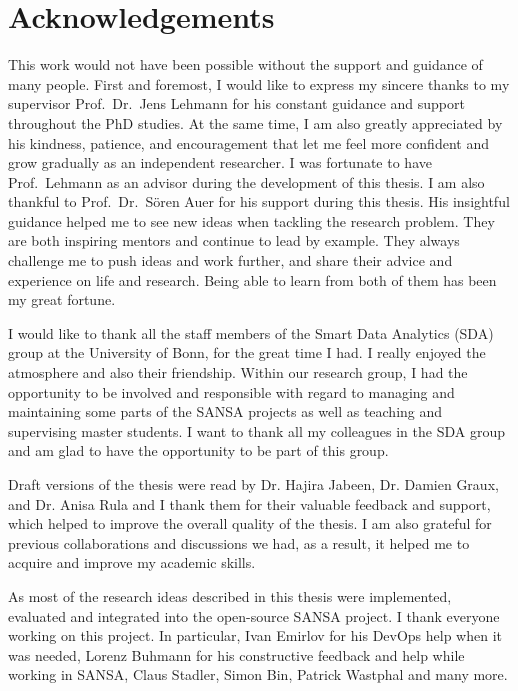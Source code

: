 \chapter*{Acknowledgements}
\label{sec:ack}
This work would not have been possible without the support and guidance of many people.
First and foremost, I would like to express my sincere thanks to my supervisor Prof.\ Dr.\ Jens Lehmann for his constant guidance and support throughout the PhD studies.
At the same time, I am also greatly appreciated by his kindness, patience, and encouragement that let me feel more confident and grow gradually as an independent researcher.
I was fortunate to have Prof.\ Lehmann as an advisor during the development of this thesis.
I am also thankful to Prof.\ Dr.\ S{\"o}ren Auer for his support during this thesis.
His insightful guidance helped me to see new ideas when tackling the research problem.
They are both inspiring mentors and continue to lead by example. 
They always challenge me to push ideas and work further, and share their advice and experience on life and research. 
Being able to learn from both of them has been my great fortune.

I would like to thank all the staff members of the Smart Data Analytics (SDA) group at the University of Bonn, for the great time I had.
I really enjoyed the atmosphere and also their friendship.
Within our research group, I had the opportunity to be involved and responsible with regard to managing and maintaining some parts of the SANSA projects as well as teaching and supervising master students.
I want to thank all my colleagues in the SDA group and am glad to have the opportunity to be part of this group.

Draft versions of the thesis were read by Dr. Hajira Jabeen, Dr. Damien Graux, and Dr. Anisa Rula and I thank them for their valuable feedback and support, which helped to improve the overall quality of the thesis.
I am also grateful for previous collaborations and discussions we had, as a result, it helped me to acquire and improve my academic skills.

As most of the research ideas described in this thesis were implemented, evaluated and integrated into the open-source SANSA project.
I thank everyone working on this project.
In particular, Ivan Emirlov for his DevOps help when it was needed, Lorenz Buhmann for his constructive feedback and help while working in SANSA, Claus Stadler, Simon Bin, Patrick Wastphal and many more.

